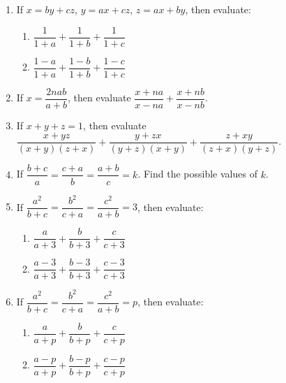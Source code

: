 \begin{enumerate}
            \item If $x=by+cz$, $y=ax+cz$, $z=ax+by$, then evaluate:
                \begin{enumerate}[label=(\alph*)]
                    \item $\dfrac{1}{1+a}+\dfrac{1}{1+b}+\dfrac{1}{1+c}$
                    \item $\dfrac{1-a}{1+a}+\dfrac{1-b}{1+b}+\dfrac{1-c}{1+c}$
                \end{enumerate}

            \item If $x=\dfrac{2nab}{a+b}$, then evaluate $\dfrac{x+na}{x-na}+\dfrac{x+nb}{x-nb}$.
            \item If $x+y+z=1$, then evaluate $\dfrac{x+yz}{(x+y)(z+x)}+\dfrac{y+zx}{(y+z)(x+y)}+\dfrac{z+xy}{(z+x)(y+z)}$.

            \item If $\dfrac{b+c}{a}=\dfrac{c+a}{b}=\dfrac{a+b}{c}=k$. Find the possible values of $k$.



            \item If $\dfrac{a^2}{b+c}=\dfrac{b^2}{c+a}=\dfrac{c^2}{a+b}=3$, then evaluate:
                \begin{enumerate}[label=(\alph*)]
                    \item $\dfrac{a}{a+3}+\dfrac{b}{b+3}+\dfrac{c}{c+3}$
                    \item $\dfrac{a-3}{a+3}+\dfrac{b-3}{b+3}+\dfrac{c-3}{c+3}$
                \end{enumerate}
            \item If $\dfrac{a^2}{b+c}=\dfrac{b^2}{c+a}=\dfrac{c^2}{a+b}=p$, then evaluate:
                \begin{enumerate}[label=(\alph*)]
                    \item $\dfrac{a}{a+p}+\dfrac{b}{b+p}+\dfrac{c}{c+p}$
                    \item $\dfrac{a-p}{a+p}+\dfrac{b-p}{b+p}+\dfrac{c-p}{c+p}$
                \end{enumerate}
            

\end{enumerate}
